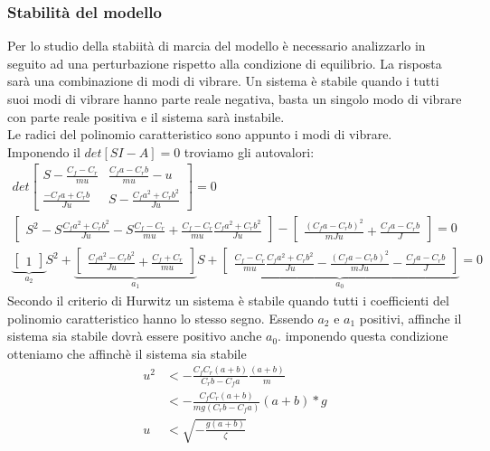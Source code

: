 \subsubsection{Stabilità del modello}
Per lo studio della stabiità di marcia del modello è necessario analizzarlo in seguito ad una perturbazione rispetto alla condizione di equilibrio.
La risposta sarà una combinazione di modi di vibrare.
Un sistema è stabile quando i tutti suoi modi di vibrare hanno parte reale negativa, basta un singolo modo di vibrare con parte reale positiva e il sistema sarà instabile.\\
Le radici del polinomio caratteristico sono appunto i modi di vibrare.\\
Imponendo il $det[SI-A]=0$ troviamo gli autovalori:
\begin{gather}det
    \begin{bmatrix}
    S-\frac{ C_f - C_r}{mu} & \frac{ C_fa - C_rb}{mu} - u\\
    \frac{ -C_fa + C_rb}{Ju}  & S-\frac{C_f a^2 + C_r b^2}{Ju} 
    \end{bmatrix} = 0 \\
    \begin{bmatrix}
        S^2 - S\frac{C_f a^2 + C_r b^2}{Ju} - S\frac{C_f-C_r}{mu} + \frac{C_f-C_r}{mu}\frac{C_f a^2 + C_r b^2}{Ju}
    \end{bmatrix}
    -
    \begin{bmatrix}
        \frac{(C_fa-C_rb)^2}{mJu} + \frac{C_fa-C_rb}{J}
    \end{bmatrix} = 0\\
    \underbrace{\begin{bmatrix}
    1
    \end{bmatrix}}_{a_2}S^2 +
    \underbrace{\begin{bmatrix}
    \frac{C_f a^2 - C_r b^2}{Ju} + \frac{C_f+C_r}{mu}
    \end{bmatrix}}_{a_1} S +
    \underbrace{\begin{bmatrix}
    \frac{C_f-C_r}{mu}\frac{C_f a^2 + C_r b^2}{Ju} - \frac{(C_fa-C_rb)^2}{mJu} - \frac{C_fa-C_rb}{J}
    \end{bmatrix}}_{a_0} = 0
\end{gather}
Secondo il criterio di Hurwitz un sistema è stabile quando tutti i coefficienti del polinomio caratteristico hanno lo stesso segno.
Essendo $a_2$ e $a_1$ positivi, affinche il sistema sia stabile dovrà essere positivo anche $a_0$.
imponendo questa condizione otteniamo che affinchè il sistema sia stabile
\begin{equation}
    \begin{split}
        u^2 & < -\frac{C_f C_r (a+b)}{C_rb-C_fa} \frac{(a+b)}{m} \\
            & < -\frac{C_f C_r (a+b)}{mg(C_rb-C_fa)} (a+b)*g \\
          u & < \sqrt{-\frac{g(a+b)}{\zeta}}
    \end{split}
\end{equation}
